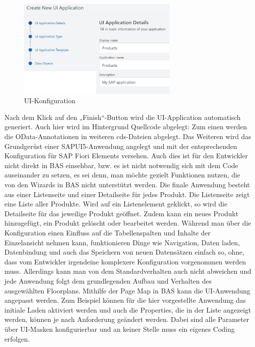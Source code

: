 \begin{figure}[htbp]
 \centering
 \includegraphics[width=0.7\textwidth]{Bilder/fiori_element/3_7_UI_Konfiguration.jpg}
 \caption{UI-Konfiguration}
\end{figure}

Nach dem Klick auf den „Finish“-Button wird die UI-Application automatisch generiert. Auch hier wird im Hintergrund Quellcode abgelegt: Zum einen werden die OData-Annotationen in weiteren cds-Dateien abgelegt. Das Weiteren wird das Grundgerüst einer SAPUI5-Anwendung angelegt und mit der entsprechenden Konfiguration für SAP Fiori Elements versehen. Auch dies ist für den Entwickler nicht direkt in BAS einsehbar, bzw. es ist nicht notwendig sich mit dem Code auseinander zu setzen, es sei denn, man möchte gezielt Funktionen nutzen, die von den Wizards in BAS nicht unterstützt werden.
Die finale Anwendung besteht aus einer Listenseite und einer Detailseite für jedes Produkt. Die Listenseite zeigt eine Liste aller Produkte. Wird auf ein Listenelement geklickt, so wird die Detailseite für das jeweilige Produkt geöffnet. Zudem kann ein neues Produkt hinzugefügt, ein Produkt gelöscht oder bearbeitet werden.  Während man über die Konfiguration einen Einfluss auf die Tabellenspalten und Inhalte der Einzelansicht nehmen kann, funktionieren Dinge wie Navigation, Daten laden, Datenbindung und auch das Speichern von neuen Datensätzen einfach so, ohne, dass vom Entwickler irgendeine komplexere Konfiguration vorgenommen werden muss. Allerdings kann man von dem Standardverhalten auch nicht abweichen und jede Anwendung folgt dem grundlegenden Aufbau und Verhalten des ausgewählten Floorplans.
Mithilfe der Page Map in BAS kann die UI-Anwendung angepasst werden. Zum Beispiel können für die hier vorgestellte Anwendung das initiale Laden aktiviert werden und auch die Properties, die in der Liste angezeigt werden, können je nach Anforderung geändert werden. Dabei sind alle Parameter über UI-Masken konfigurierbar und an keiner Stelle muss ein eigenes Coding erfolgen.


